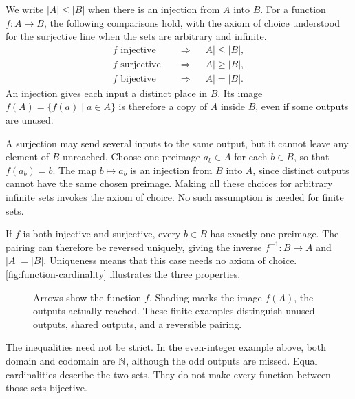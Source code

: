 \begin{remark}
  \label{thm:analysis-i:function-cardinality}
  We write $|A|\le|B|$ when there is an injection from $A$ into $B$.
  For a function $f:A\to B$, the following comparisons hold, with the
  axiom of choice understood for the surjective line when the sets
  are arbitrary and infinite.
  \[
    \begin{aligned}
      f\text{ injective}&\quad\Longrightarrow\quad |A|\le|B|,\\
      f\text{ surjective}&\quad\Longrightarrow\quad |A|\ge|B|,\\
      f\text{ bijective}&\quad\Longrightarrow\quad |A|=|B|.
    \end{aligned}
  \]
  An injection gives each input a distinct place in $B$. Its image
  $f(A)=\{f(a)\mid a\in A\}$ is therefore a copy of $A$ inside $B$,
  even if some outputs are unused.

  A surjection may send several inputs to the same output, but it
  cannot leave any element of $B$ unreached. Choose one preimage
  $a_b\in A$ for each $b\in B$, so that $f(a_b)=b$. The map
  $b\mapsto a_b$ is an injection from $B$ into $A$, since distinct
  outputs cannot have the same chosen preimage. Making all these
  choices for arbitrary infinite sets invokes the axiom of choice.
  No such assumption is needed for finite sets.

  If $f$ is both injective and surjective, every $b\in B$ has exactly
  one preimage. The pairing can therefore be reversed uniquely,
  giving the inverse $f^{-1}:B\to A$ and $|A|=|B|$. Uniqueness means
  that this case needs no axiom of choice.
  \autoref{fig:function-cardinality} illustrates the three properties.
\end{remark}


\begin{figure}[htbp]
  \centering
  
  \caption[How functions compare set sizes.]{Arrows
    show the function $f$. Shading marks the image $f(A)$, the outputs
    actually reached. These finite examples distinguish unused outputs,
    shared outputs, and a reversible pairing.}
  \label{fig:function-cardinality}
\end{figure}


The inequalities need not be strict. In the even-integer example above,
both domain and codomain are $\mathbb{N}$, although the odd outputs are missed.
Equal cardinalities describe the two sets. They do not make every
function between those sets bijective.



